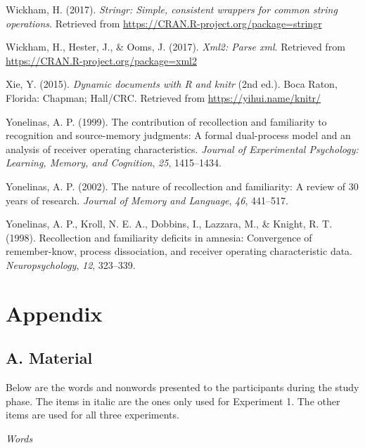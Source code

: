 \documentclass[english,,man]{apa6}
\begin{document}
\leavevmode\hypertarget{ref-R-stringr}{}%
Wickham, H. (2017). \emph{Stringr: Simple, consistent wrappers for common string operations}. Retrieved from \url{https://CRAN.R-project.org/package=stringr}

\leavevmode\hypertarget{ref-R-xml2}{}%
Wickham, H., Hester, J., \& Ooms, J. (2017). \emph{Xml2: Parse xml}. Retrieved from \url{https://CRAN.R-project.org/package=xml2}

\leavevmode\hypertarget{ref-R-knitr}{}%
Xie, Y. (2015). \emph{Dynamic documents with R and knitr} (2nd ed.). Boca Raton, Florida: Chapman; Hall/CRC. Retrieved from \url{https://yihui.name/knitr/}

\leavevmode\hypertarget{ref-Yonelinas:1999}{}%
Yonelinas, A. P. (1999). The contribution of recollection and familiarity to recognition and source-memory judgments: A formal dual-process model and an analysis of receiver operating characteristics. \emph{Journal of Experimental Psychology: Learning, Memory, and Cognition}, \emph{25}, 1415--1434.

\leavevmode\hypertarget{ref-Yonelinas:2002}{}%
Yonelinas, A. P. (2002). The nature of recollection and familiarity: A review of 30 years of research. \emph{Journal of Memory and Language}, \emph{46}, 441--517.

\leavevmode\hypertarget{ref-Yonelinas:etal:1998}{}%
Yonelinas, A. P., Kroll, N. E. A., Dobbins, I., Lazzara, M., \& Knight, R. T. (1998). Recollection and familiarity deficits in amnesia: Convergence of remember-know, process dissociation, and receiver operating characteristic data. \emph{Neuropsychology}, \emph{12}, 323--339.

\endgroup

\hypertarget{appendix}{%
\section{Appendix}\label{appendix}}

\hypertarget{a.-material}{%
\subsection{A. Material}\label{a.-material}}

Below are the words and nonwords presented to the participants during the study phase. The items in italic are the ones only used for Experiment 1. The other items are used for all three experiments.

\emph{Words}
\end{document}
